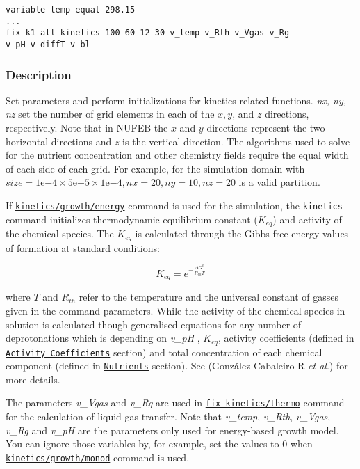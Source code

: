 \documentclass[11pt,a4paper,openright]{article}
\begin{document}
\begin{Verbatim}[frame=single]
variable temp equal 298.15
...
fix k1 all kinetics 100 60 12 30 v_temp v_Rth v_Vgas v_Rg
v_pH v_diffT v_bl
\end{Verbatim}

\subsubsection*{Description}

Set parameters and perform initializations for kinetics-related functions. {\it nx, ny, nz }
set the number of grid elements in each of the $x, y$, and $z$ directions, respectively. Note that in NUFEB the $x$
and $y$ directions represent the two horizontal directions and $z$ is the vertical direction. The algorithms
used to solve for the nutrient concentration and other chemistry fields require the equal width of each
side of each grid. For example, for the simulation domain with $size = 1\mathrm{e}{-4} \times 5\mathrm{e}{-5} \times 1\mathrm{e}{-4}, nx = 20, ny = 10, nz = 20$ is a valid partition. 

If \hyperref[fkineticsenergy]{\tt kinetics/growth/energy} command is used for the simulation, the {\tt kinetics} command initializes 
thermodynamic equilibrium constant ($K_{eq}$) and activity of the chemical species.
The $K_{eq}$ is calculated through
the Gibbs free energy values of formation at standard conditions:

\[ K_{eq} = e^{-\frac{\Delta G^0}{R_{th}T}} \] 

where $T$ and $R_{th}$ refer to the temperature and the universal constant of gasses given in the command parameters.
While the activity of the chemical species in solution is calculated though generalised equations for any number of deprotonations which is depending on {\it v\_pH }, $K_{eq}$, 
activity coefficients (defined in \hyperref[sactivitycoeff]{\tt Activity Coefficients} section) and total concentration of each chemical component (defined in \hyperref[snutrients]{\tt Nutrients} section). See (González-Cabaleiro R {\it et al}.) for more details.


The parameters {\it v\_Vgas } and {\it v\_Rg} are used 
in \hyperref[fkineticsthermo]{\tt fix kinetics/thermo} command for the calculation of liquid-gas transfer. 
Note that {\it v\_temp}, {\it v\_Rth}, {\it v\_Vgas}, {\it v\_Rg} 
and {\it v\_pH} are the parameters only used for energy-based growth model. 
You can ignore those variables by, for example, set the values to 0 when 
\hyperref[fkineticsmonod]{\tt kinetics/growth/monod} command is used. 
\end{document}
